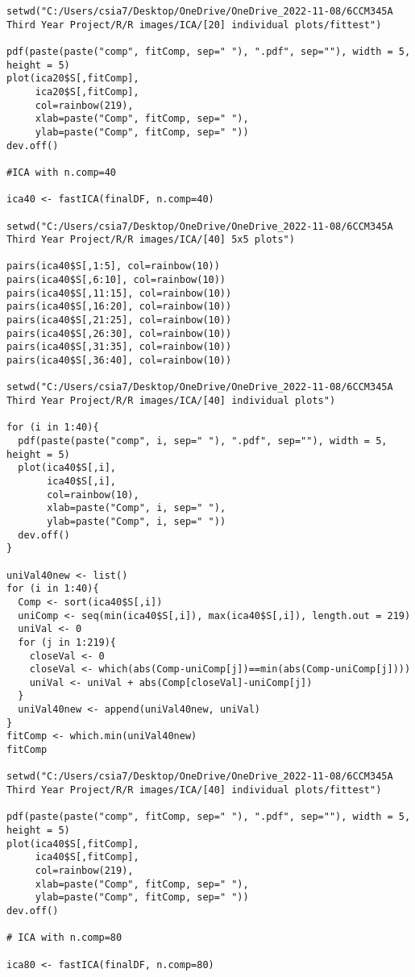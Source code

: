 \begin{verbatim}
setwd("C:/Users/csia7/Desktop/OneDrive/OneDrive_2022-11-08/6CCM345A Third Year Project/R/R images/ICA/[20] individual plots/fittest")

pdf(paste(paste("comp", fitComp, sep=" "), ".pdf", sep=""), width = 5, height = 5) 
plot(ica20$S[,fitComp],
     ica20$S[,fitComp], 
     col=rainbow(219), 
     xlab=paste("Comp", fitComp, sep=" "), 
     ylab=paste("Comp", fitComp, sep=" "))
dev.off()

#ICA with n.comp=40 

ica40 <- fastICA(finalDF, n.comp=40)

setwd("C:/Users/csia7/Desktop/OneDrive/OneDrive_2022-11-08/6CCM345A Third Year Project/R/R images/ICA/[40] 5x5 plots")

pairs(ica40$S[,1:5], col=rainbow(10))
pairs(ica40$S[,6:10], col=rainbow(10))
pairs(ica40$S[,11:15], col=rainbow(10))
pairs(ica40$S[,16:20], col=rainbow(10))
pairs(ica40$S[,21:25], col=rainbow(10))
pairs(ica40$S[,26:30], col=rainbow(10))
pairs(ica40$S[,31:35], col=rainbow(10))
pairs(ica40$S[,36:40], col=rainbow(10))

setwd("C:/Users/csia7/Desktop/OneDrive/OneDrive_2022-11-08/6CCM345A Third Year Project/R/R images/ICA/[40] individual plots")

for (i in 1:40){
  pdf(paste(paste("comp", i, sep=" "), ".pdf", sep=""), width = 5, height = 5) 
  plot(ica40$S[,i],
       ica40$S[,i], 
       col=rainbow(10), 
       xlab=paste("Comp", i, sep=" "), 
       ylab=paste("Comp", i, sep=" "))
  dev.off()
}

uniVal40new <- list()
for (i in 1:40){
  Comp <- sort(ica40$S[,i])
  uniComp <- seq(min(ica40$S[,i]), max(ica40$S[,i]), length.out = 219)
  uniVal <- 0
  for (j in 1:219){
    closeVal <- 0
    closeVal <- which(abs(Comp-uniComp[j])==min(abs(Comp-uniComp[j])))
    uniVal <- uniVal + abs(Comp[closeVal]-uniComp[j])
  }
  uniVal40new <- append(uniVal40new, uniVal)
}
fitComp <- which.min(uniVal40new)
fitComp

setwd("C:/Users/csia7/Desktop/OneDrive/OneDrive_2022-11-08/6CCM345A Third Year Project/R/R images/ICA/[40] individual plots/fittest")

pdf(paste(paste("comp", fitComp, sep=" "), ".pdf", sep=""), width = 5, height = 5) 
plot(ica40$S[,fitComp],
     ica40$S[,fitComp], 
     col=rainbow(219), 
     xlab=paste("Comp", fitComp, sep=" "), 
     ylab=paste("Comp", fitComp, sep=" "))
dev.off()

# ICA with n.comp=80 

ica80 <- fastICA(finalDF, n.comp=80)


\end{verbatim}
